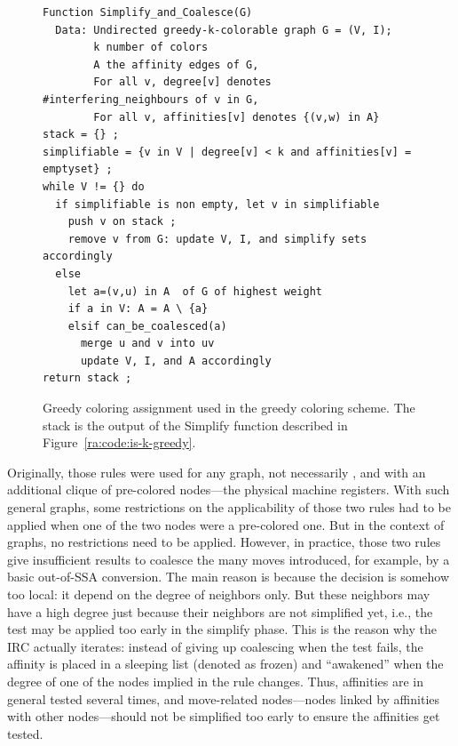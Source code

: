 {\begin{figure}
\begin{verbatim}
Function Simplify_and_Coalesce(G)
  Data: Undirected greedy-k-colorable graph G = (V, I);
        k number of colors
        A the affinity edges of G,
        For all v, degree[v] denotes #interfering_neighbours of v in G,
        For all v, affinities[v] denotes {(v,w) in A} 
stack = {} ;
simplifiable = {v in V | degree[v] < k and affinities[v] = emptyset} ;
while V != {} do
  if simplifiable is non empty, let v in simplifiable
    push v on stack ;
    remove v from G: update V, I, and simplify sets accordingly
  else
    let a=(v,u) in A  of G of highest weight
    if a in V: A = A \ {a}
    elsif can_be_coalesced(a)
      merge u and v into uv
      update V, I, and A accordingly
return stack ;
\end{verbatim}
\caption{Greedy coloring assignment used in the greedy coloring scheme. The stack is the output of the Simplify function described in Figure~\ref{ra:code:is-k-greedy}.}
\label{fig:ra:code:IRC}
\end{figure}

Originally, those rules were used for any graph, not necessarily , and with an additional clique of pre-colored nodes---the physical machine registers.
With such general graphs, some restrictions on the applicability of those two rules had to be applied when one of the two nodes were a pre-colored one.
But in the context of  graphs, no restrictions need to be applied.
However, in practice, those two rules give insufficient results to coalesce the many moves introduced, for example, by a basic out-of-{SSA} conversion.
The main reason is because the decision is somehow too local:
it depend on the degree of neighbors only. 
But these neighbors may have a high degree just because their neighbors are not simplified yet, i.e., the test may be applied too early in the simplify phase. 
This is the reason why the IRC actually iterates: 
instead of giving up coalescing when the test fails, the affinity is placed in a sleeping list (denoted as frozen) and ``awakened'' when the degree of one of the nodes implied in the rule changes. 
Thus, affinities are in general tested several times, and move-related nodes---nodes linked by affinities with other nodes---should not be simplified too early to ensure the affinities get tested.

}
